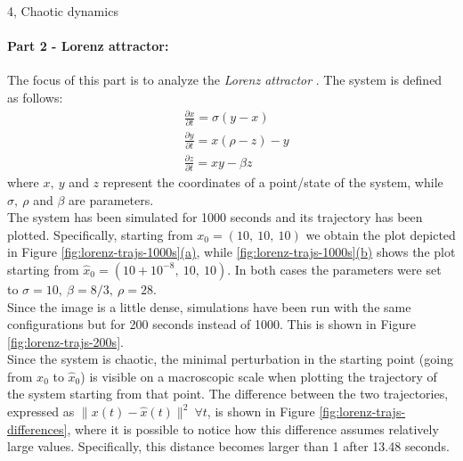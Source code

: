 \documentclass[10pt,a4paper]{article}
\begin{document}
\begin{task}{4, Chaotic dynamics}
\paragraph{Part 2 - Lorenz attractor:}
The focus of this part is to analyze the \textit{Lorenz attractor} \cite{lorenz}.
The system is defined as follows:
\begin{equation}\label{eq:lorenz}
    \begin{split}
        &\frac{\partial x}{\partial t} = \sigma(y - x)\\
        &\frac{\partial y}{\partial t} = x(\rho - z) - y\\
        &\frac{\partial z}{\partial t} = x y - \beta z
    \end{split}
\end{equation}
where $x,\ y$ and $z$ represent the coordinates of a point/state of the system, while $\sigma,\ \rho$ and $\beta$ are parameters.\\
The system has been simulated for 1000 seconds and its trajectory has been plotted.
Specifically, starting from $x_0 = (10,\ 10,\ 10)$ we obtain the plot depicted in Figure \hyperref[fig:lorenz-trajs-1000s]{\ref{fig:lorenz-trajs-1000s}(a)}, while \hyperref[fig:lorenz-trajs-1000s]{\ref{fig:lorenz-trajs-1000s}(b)} shows the plot starting from $\hat{x}_0 = (10+10^{-8},\ 10,\ 10)$.
In both cases the parameters were set to $\sigma = 10,\ \beta = 8/3,\ \rho = 28$.\\
Since the image is a little dense, simulations have been run with the same configurations but for 200 seconds instead of 1000.
This is shown in Figure \ref{fig:lorenz-trajs-200s}.\\
Since the system is chaotic, the minimal perturbation in the starting point (going from $x_0$ to $\hat{x}_0$) is visible on a macroscopic scale when plotting the trajectory of the system starting from that point.
The difference between the two trajectories, expressed as $\|x(t)-\hat{x}(t)\|^2\ \forall t$, is shown in Figure \ref{fig:lorenz-trajs-differences}, where it is possible to notice how this difference assumes relatively large values.
Specifically, this distance becomes larger than 1 after 13.48 seconds.


\end{task}
\end{document}
